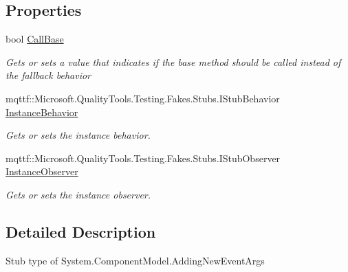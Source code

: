 \subsection*{Properties}
\begin{DoxyCompactItemize}
\item 
bool \hyperlink{class_system_1_1_component_model_1_1_fakes_1_1_stub_adding_new_event_args_a1680d96812e73ccfb87f46a8a9a446b0}{Call\-Base}
\begin{DoxyCompactList}\small\item\em Gets or sets a value that indicates if the base method should be called instead of the fallback behavior\end{DoxyCompactList}\item 
mqttf\-::\-Microsoft.\-Quality\-Tools.\-Testing.\-Fakes.\-Stubs.\-I\-Stub\-Behavior \hyperlink{class_system_1_1_component_model_1_1_fakes_1_1_stub_adding_new_event_args_abd2bdce8f2c861c5a184033cc6b0370e}{Instance\-Behavior}
\begin{DoxyCompactList}\small\item\em Gets or sets the instance behavior.\end{DoxyCompactList}\item 
mqttf\-::\-Microsoft.\-Quality\-Tools.\-Testing.\-Fakes.\-Stubs.\-I\-Stub\-Observer \hyperlink{class_system_1_1_component_model_1_1_fakes_1_1_stub_adding_new_event_args_a729431faae6880462d0d896543cd6f57}{Instance\-Observer}
\begin{DoxyCompactList}\small\item\em Gets or sets the instance observer.\end{DoxyCompactList}\end{DoxyCompactItemize}


\subsection{Detailed Description}
Stub type of System.\-Component\-Model.\-Adding\-New\-Event\-Args



